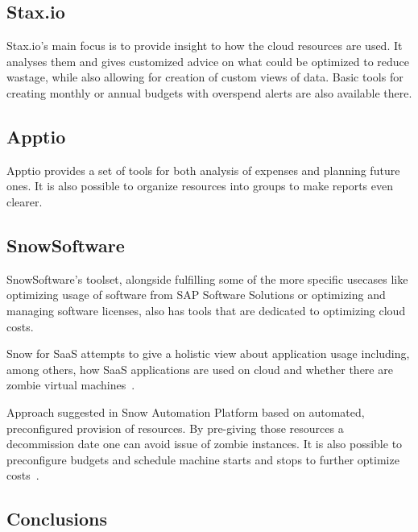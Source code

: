 \documentclass[licencjacka,en]{thesisclass}
\begin{document}
    \begin{flushright}
        \cite{Cloudability}
    \end{flushright}

    \subsection{Stax.io}

    Stax.io's main focus is to provide insight to how the cloud resources are used.
    It analyses them and gives customized advice on what could be optimized to reduce wastage,
    while also allowing for creation of custom views of data.
    Basic tools for creating monthly or annual budgets with overspend alerts are also available there.

    \begin{flushright}
        \cite{Stax.io}
    \end{flushright}

    \subsection{Apptio}

    Apptio provides a set of tools for both analysis of expenses and planning future ones.
    It is also possible to organize resources into groups to make reports even clearer.

    \subsection{SnowSoftware}

    SnowSoftware's toolset, alongside fulfilling some of the more specific usecases
    like optimizing usage of software from SAP Software Solutions or optimizing and managing software licenses,
    also has tools that are dedicated to optimizing cloud costs.

    Snow for SaaS attempts to give a holistic view about application usage including, among others,
    how SaaS applications are used on cloud and whether there are zombie virtual machines~\cite{SnowSaaS}.

    Approach suggested in Snow Automation Platform based on automated, preconfigured provision of resources.
    By pre-giving those resources a decommission date one can avoid issue of zombie instances.
    It is also possible to preconfigure budgets and schedule machine starts and stops to further optimize costs~\cite{SnowBlog}.

    \subsection{Conclusions}
\end{document}
